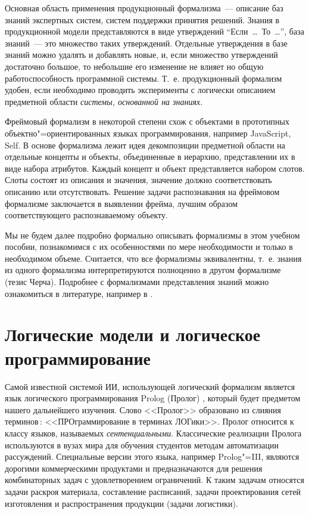 \documentclass[a4paper,14pt, openany, twoside, draft]{extbook} %
\begin{document}
Основная область применения продукционный формализма~--- описание баз знаний экспертных систем, систем поддержки принятия решений.  Знания в продукционной модели представляются в виде утверждений ``Если\ \ldots{}\ То\ \ldots{}'', база знаний~--- это множество таких утверждений.  Отдельные утверждения в базе знаний можно удалять и добавлять новые, и, если множество утверждений достаточно большое, то небольшие его изменение не влияет но общую работоспособность программной системы.  Т.~е. продукционный формализм удобен, если необходимо проводить эксперименты с логически описанием предметной области \emph{системы, основанной на знаниях}.

Фреймовый формализм в некоторой степени схож с объектами в прототипных объектно"=ориентированных языках программирования, например JavaScript, Self.  В основе формализма лежит идея декомпозиции предметной области на отдельные концепты и объекты, объединенные в иерархию, представлении их в виде набора атрибутов.  Каждый концепт и объект представляется набором слотов.  Слоты состоят из описания и значения, значение должно соответствовать описанию или отсутствовать.  Решение задачи распознавания на фреймовом формализме заключается в выявлении фрейма, лучшим образом соответствующего распознаваемому объекту.

Мы не будем далее подробно формально описывать формализмы в этом учебном пособии, познакомимся с их особенностями по мере необходимости и только в необходимом объеме.  Считается, что все формализмы эквивалентны, т.~е. знания из одного формализма интерпретируются полноценно в другом формализме (тезис Черча).  Подробнее с формализмами представления знаний можно ознакомиться в литературе, например в \cite{kompknow, dict92, myrlp}.

\chapter{Логические модели и логическое программирование}

Самой известной системой ИИ, использующей логический формализм является язык логического программирования \foreignlanguage{english}{Prolog} (Пролог) \cite{Bratko}, который будет предметом нашего дальнейшего изучения.  Слово <<Пролог>> образовано из слияния терминов\,: <<ПРОграммирование в терминах ЛОГики>>. Пролог относится к классу языков, называемых \emph{сентенциальными}.  Классические реализации Пролога используются в вузах мира для обучения студентов методам автоматизации рассуждений.  Специальные версии этого языка, например Prolog"=III, являются дорогими коммерческими продуктами и предназначаются для решения комбинаторных задач с удовлетворением ограничений.  К таким задачам относятся задачи раскроя материала, составление расписаний, задачи проектирования сетей изготовления и распространения продукции (задачи логистики).
\end{document}
